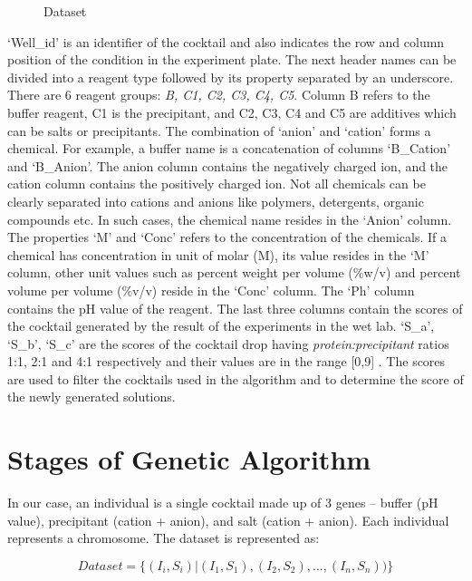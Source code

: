 \begin{figure}[H]
	\caption{Dataset}
	\label{fig:dataset}
\end{figure}

`Well\_id' is an identifier of the cocktail and also indicates the row and column position of the condition in the experiment plate. The next header names can be divided into a reagent type followed by its property separated by an underscore. There are 6 reagent groups: \textit{B, C1, C2, C3, C4, C5}. Column B refers to the buffer reagent, C1 is the precipitant, and C2, C3, C4 and C5 are additives which can be salts or precipitants. The combination of `anion' and `cation' forms a chemical. For example, a buffer name is a concatenation of columns `B\_Cation' and `B\_Anion'. The anion column contains the negatively charged ion, and the cation column contains the positively charged ion. Not all chemicals can be clearly separated into cations and anions like polymers, detergents, organic compounds etc. In such cases, the chemical name resides in the `Anion' column. The properties `M' and `Conc' refers to the concentration of the chemicals. If a chemical has concentration in unit of molar (M), its value resides in the `M' column, other unit values such as percent weight per volume (\%w/v) and percent volume per volume (\%v/v) reside in the `Conc' column. The `Ph' column contains the pH value of the reagent. The last three columns contain the scores of the cocktail generated by the result of the experiments in the wet lab. `S\_a', `S\_b', `S\_c' are the scores of the cocktail drop having \textit{protein:precipitant} ratios 1:1, 2:1 and 4:1 respectively and their values are in the range [0,9] \cite{OptimizeAED}. The scores are used to filter the cocktails used in the algorithm and to determine the score of the newly generated solutions.


\section{Stages of Genetic Algorithm} \label{sec:GA-stages}

In our case, an individual is a single cocktail made up of 3 genes -- buffer (pH value), precipitant (cation + anion), and  salt (cation + anion). Each individual represents a chromosome. The dataset is represented as:

\begin{equation}
Dataset = \{(I_{i}, S_{i}) |(I_{1},S_{1}), (I_{2},S_{2}), ..., (I_{n},S_{n}) ) \} \label{eq}
\end{equation}

